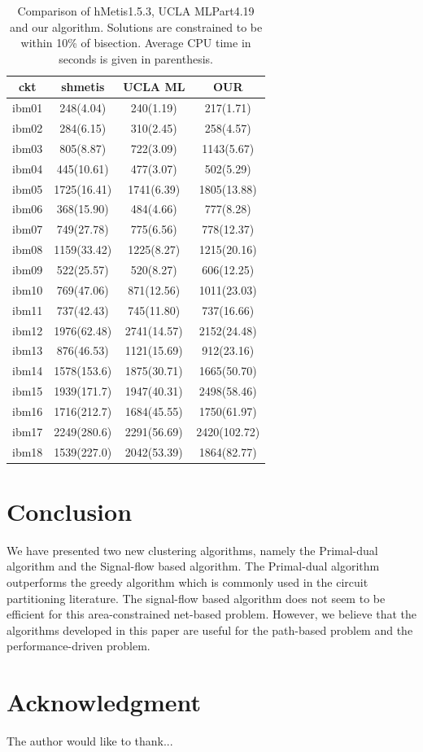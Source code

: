 \documentclass[journal]{IEEEtran}
\begin{document}
\begin{table}
\renewcommand{\arraystretch}{1.3}
\caption{Comparison of hMetis1.5.3, UCLA MLPart4.19 and our algorithm.
  Solutions are constrained to be within 10\% of bisection. Average CPU
  time in seconds is given in parenthesis.}
\label{leading_10}
\centering
\begin{tabular}{|c||c|c|c|}
\hline
\bfseries ckt & \bfseries shmetis & \bfseries UCLA ML & \bfseries OUR \\
\hline\hline
ibm01 & 248(4.04)   & 240(1.19)   &  217(1.71)    \\
ibm02 & 284(6.15)   & 310(2.45)   &  258(4.57)	  \\
ibm03 & 805(8.87)   & 722(3.09)   &  1143(5.67)	  \\
ibm04 & 445(10.61)  & 477(3.07)   &  502(5.29)	  \\
ibm05 & 1725(16.41) & 1741(6.39)  &  1805(13.88)  \\
ibm06 & 368(15.90)  & 484(4.66)   &  777(8.28)	  \\
ibm07 & 749(27.78)  & 775(6.56)   &  778(12.37)	  \\
ibm08 & 1159(33.42) & 1225(8.27)  &  1215(20.16)  \\
ibm09 & 522(25.57)  & 520(8.27)   &  606(12.25)	  \\
ibm10 & 769(47.06)  & 871(12.56)  &  1011(23.03)  \\
ibm11 & 737(42.43)  & 745(11.80)  &  737(16.66)	  \\
ibm12 & 1976(62.48) & 2741(14.57) &  2152(24.48)  \\
ibm13 & 876(46.53)  & 1121(15.69) &  912(23.16)	  \\
ibm14 & 1578(153.6) & 1875(30.71) &  1665(50.70)  \\
ibm15 & 1939(171.7) & 1947(40.31) &  2498(58.46)  \\
ibm16 & 1716(212.7) & 1684(45.55) &  1750(61.97)  \\
ibm17 & 2249(280.6) & 2291(56.69) &  2420(102.72) \\
ibm18 & 1539(227.0) & 2042(53.39) &  1864(82.77)  \\
\hline
\end{tabular}
\end{table}

\section{Conclusion}
\label{conclusion}
We have presented two new clustering algorithms, namely the
Primal-dual algorithm and the Signal-flow based algorithm. The Primal-dual
algorithm outperforms the greedy algorithm which is
commonly used in the circuit partitioning literature. 
The signal-flow based algorithm does
not seem to be efficient for this area-constrained net-based problem.
However, we believe that the algorithms developed in this paper are
useful for the path-based problem and the performance-driven problem.

\section*{Acknowledgment}
The author would like to thank...~\cite{ispd98_benchmark}

%


\end{document}
